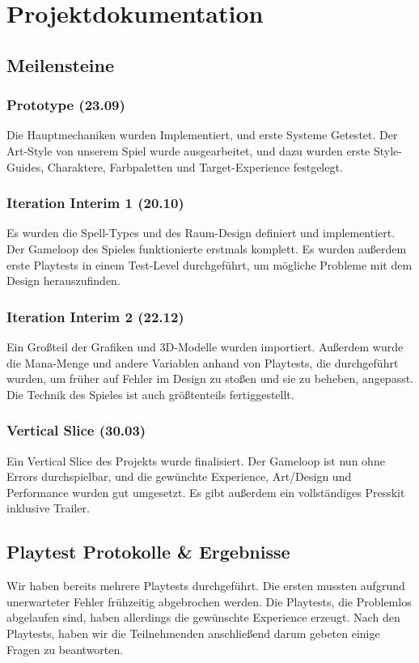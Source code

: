 \chapter{Projektdokumentation}

\section{Meilensteine}

\subsection{Prototype (23.09)}
Die Hauptmechaniken wurden Implementiert, und erste Systeme Getestet. Der Art-Style von unserem Spiel wurde ausgearbeitet, und dazu wurden erste Style-Guides, Charaktere, Farbpaletten und Target-Experience festgelegt.

\subsection{Iteration Interim 1 (20.10)}
Es wurden die Spell-Types und des Raum-Design definiert und implementiert. Der Gameloop des Spieles funktionierte erstmals komplett. Es wurden außerdem erste Playtests in einem Test-Level durchgeführt, um mögliche Probleme mit dem Design herauszufinden.

\subsection{Iteration Interim 2 (22.12)}
Ein Großteil der Grafiken und 3D-Modelle wurden importiert. Außerdem wurde die Mana-Menge und andere Variablen anhand von Playtests, die durchgeführt wurden, um früher auf Fehler im Design zu stoßen und sie zu beheben, angepasst. Die Technik des Spieles ist auch größtenteils fertiggestellt.

\subsection{Vertical Slice (30.03)}
Ein Vertical Slice des Projekts wurde finalisiert. Der Gameloop ist nun ohne Errors durchspielbar, und die gewünchte Experience, Art/Design und Performance wurden gut umgesetzt. Es gibt außerdem ein vollständiges Presskit inklusive Trailer.

\section{Playtest Protokolle \& Ergebnisse}
Wir haben bereits mehrere Playtests durchgeführt. Die ersten mussten aufgrund unerwarteter Fehler frühzeitig abgebrochen werden. Die Playtests, die Problemlos abgelaufen sind, haben allerdings die gewünschte Experience erzeugt. Nach den Playtests, haben wir die Teilnehmenden anschließend darum gebeten einige Fragen zu beantworten.

